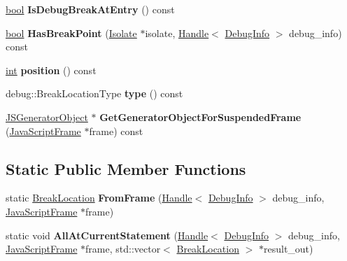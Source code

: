 \begin{DoxyCompactItemize}
\mbox{\hyperlink{classbool}{bool}} {\bfseries Is\+Debug\+Break\+At\+Entry} () const
\item 
\mbox{\label{classv8_1_1internal_1_1BreakLocation_aed075ff2836df7c831b8cdde69171afa}} 
\mbox{\hyperlink{classbool}{bool}} {\bfseries Has\+Break\+Point} (\mbox{\hyperlink{classv8_1_1internal_1_1Isolate}{Isolate}} $\ast$isolate, \mbox{\hyperlink{classv8_1_1internal_1_1Handle}{Handle}}$<$ \mbox{\hyperlink{classv8_1_1internal_1_1DebugInfo}{Debug\+Info}} $>$ debug\+\_\+info) const
\item 
\mbox{\label{classv8_1_1internal_1_1BreakLocation_acbcfb74c28ab9bcc47a7c7c7895bcf2d}} 
\mbox{\hyperlink{classint}{int}} {\bfseries position} () const
\item 
\mbox{\label{classv8_1_1internal_1_1BreakLocation_afedb2190ca8639a677f82e345f291954}} 
debug\+::\+Break\+Location\+Type {\bfseries type} () const
\item 
\mbox{\label{classv8_1_1internal_1_1BreakLocation_a35ed347b7d43b3c2a3e4fb89569eca5d}} 
\mbox{\hyperlink{classv8_1_1internal_1_1JSGeneratorObject}{J\+S\+Generator\+Object}} $\ast$ {\bfseries Get\+Generator\+Object\+For\+Suspended\+Frame} (\mbox{\hyperlink{classv8_1_1internal_1_1JavaScriptFrame}{Java\+Script\+Frame}} $\ast$frame) const
\end{DoxyCompactItemize}
\subsection*{Static Public Member Functions}
\begin{DoxyCompactItemize}
\item 
\mbox{\label{classv8_1_1internal_1_1BreakLocation_ae044ee54e8b28e0325c040be247a3c7d}} 
static \mbox{\hyperlink{classv8_1_1internal_1_1BreakLocation}{Break\+Location}} {\bfseries From\+Frame} (\mbox{\hyperlink{classv8_1_1internal_1_1Handle}{Handle}}$<$ \mbox{\hyperlink{classv8_1_1internal_1_1DebugInfo}{Debug\+Info}} $>$ debug\+\_\+info, \mbox{\hyperlink{classv8_1_1internal_1_1JavaScriptFrame}{Java\+Script\+Frame}} $\ast$frame)
\item 
\mbox{\label{classv8_1_1internal_1_1BreakLocation_a336b5ba32283fa0d5e71800fa28ca99d}} 
static void {\bfseries All\+At\+Current\+Statement} (\mbox{\hyperlink{classv8_1_1internal_1_1Handle}{Handle}}$<$ \mbox{\hyperlink{classv8_1_1internal_1_1DebugInfo}{Debug\+Info}} $>$ debug\+\_\+info, \mbox{\hyperlink{classv8_1_1internal_1_1JavaScriptFrame}{Java\+Script\+Frame}} $\ast$frame, std\+::vector$<$ \mbox{\hyperlink{classv8_1_1internal_1_1BreakLocation}{Break\+Location}} $>$ $\ast$result\+\_\+out)
\end{DoxyCompactItemize}
